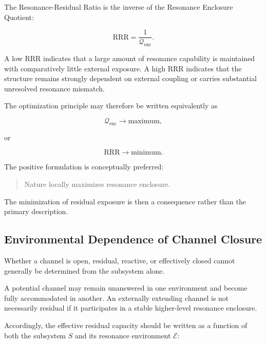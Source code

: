 \documentclass[11pt,a4paper]{article}
\begin{document}
The Resonance-Residual Ratio is the inverse of the Resonance Enclosure Quotient:

\begin{equation}
    \mathrm{RRR}
    =
    \frac{1}{\mathcal{Q}_{\mathrm{enc}}}.
\end{equation}

A low RRR indicates that a large amount of resonance capability is maintained with comparatively little external exposure. A high RRR indicates that the structure remains strongly dependent on external coupling or carries substantial unresolved resonance mismatch.

The optimization principle may therefore be written equivalently as

\begin{equation}
    \mathcal{Q}_{\mathrm{enc}}
    \rightarrow \mathrm{maximum},
\end{equation}

or

\begin{equation}
    \mathrm{RRR}
    \rightarrow \mathrm{minimum}.
\end{equation}

The positive formulation is conceptually preferred:

\begin{quote}
Nature locally maximizes resonance enclosure.
\end{quote}

The minimization of residual exposure is then a consequence rather than the primary description.


\subsection{Environmental Dependence of Channel Closure}
\label{sec:environmental_channel_closure}

Whether a channel is open, residual, reactive, or effectively closed cannot generally be determined from the subsystem alone.

A potential channel may remain unanswered in one environment and become fully accommodated in another. An externally extending channel is not necessarily residual if it participates in a stable higher-level resonance enclosure.

Accordingly, the effective residual capacity should be written as a function of both the subsystem $S$ and its resonance environment $\mathcal{E}$:
\end{document}
